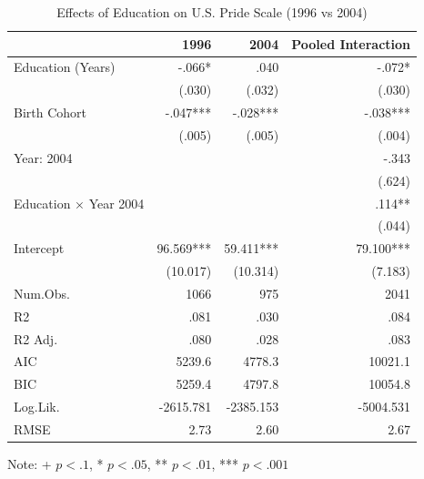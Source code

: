 \begin{table}[htbp]
\centering
\begin{threeparttable}
\caption{Effects of Education on U.S. Pride Scale (1996 vs 2004)}
\label{tab:educ}
\small
\begin{tabular}{lrrr}
\toprule
& 1996 & 2004 & Pooled Interaction \\
\midrule
Education (Years) & -.066* & .040 & -.072* \\
& (.030) & (.032) & (.030) \\
Birth Cohort & -.047*** & -.028*** & -.038*** \\
& (.005) & (.005) & (.004) \\
Year: 2004 &  &  & -.343 \\
&  &  & (.624) \\
Education × Year 2004 &  &  & .114** \\
&  &  & (.044) \\
Intercept & 96.569*** & 59.411*** & 79.100*** \\
& (10.017) & (10.314) & (7.183) \\
Num.Obs. & 1066 & 975 & 2041 \\
R2 & .081 & .030 & .084 \\
R2 Adj. & .080 & .028 & .083 \\
AIC & 5239.6 & 4778.3 & 10021.1 \\
BIC & 5259.4 & 4797.8 & 10054.8 \\
Log.Lik. & -2615.781 & -2385.153 & -5004.531 \\
RMSE & 2.73 & 2.60 & 2.67 \\
\bottomrule
\end{tabular}
\begin{tablenotes}
\small
Note: + $p < .1$, * $p < .05$, ** $p < .01$, *** $p < .001$
\end{tablenotes}
\end{threeparttable}
\end{table}
